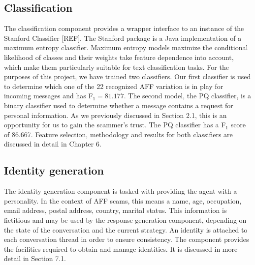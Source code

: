 \subsection*{Classification}
The classification component provides a wrapper interface to an instance of the Stanford Classifier [REF]. The Stanford package is a Java implementation of a maximum entropy classifier. Maximum entropy models maximize the conditional likelihood of classes and their weights take feature dependence into account, which make them particularly suitable for text classification tasks. For the purposes of this project, we have trained two classifiers. Our first classifier is used to determine which one of the 22 recognized AFF variation is in play for incoming messages and has F$_{1} = 81.177$. The second model, the PQ classifier, is a binary classifier used to determine whether a message contains a request for personal information. As we previously discussed in Section 2.1, this is an opportunity for us to gain the scammer's trust. The PQ classifier has a F$_{1}$ score of 86.667. Feature selection, methodology and results for both classifiers are discussed in detail in Chapter 6.

\subsection*{Identity generation}
The identity generation component is tasked with providing the agent with a personality. In the context of AFF scams, this means a name, age, occupation, email address, postal address, country, marital status. This information is fictitious and may be used by the response generation component, depending on the state of the conversation and the current strategy. An identity is attached to each conversation thread in order to ensure consistency. The component provides the facilities required to obtain and manage identities. It is discussed in more detail in Section 7.1.


